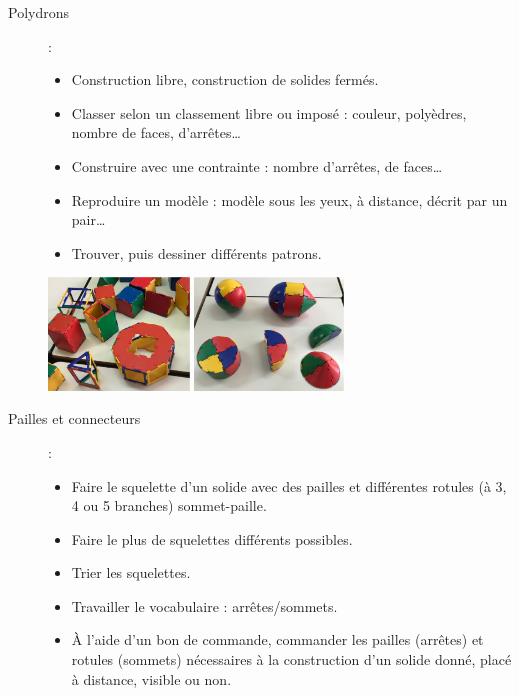 \begin{exercice*}
\begin{description}
   \item[Polydrons]:
      \begin{itemize}
         \item Construction libre, construction de solides fermés.
         \item Classer selon un classement libre ou imposé : couleur, polyèdres, nombre de faces, d'arrêtes\dots
         \item Construire avec une contrainte : nombre d'arrêtes, de faces\dots
         \item Reproduire un modèle : modèle sous les yeux, à distance, décrit par un pair\dots
         \item Trouver, puis dessiner différents patrons.
      \end{itemize}
      \begin{center}
         \includegraphics[height=3cm]{Geometrie_did/Images/Geo6_activites_polydron2} \qquad \includegraphics[height=3cm]{Geometrie_did/Images/Geo6_activites_polydron1}
      \end{center}
   \item[Pailles et connecteurs]:
      \begin{itemize}
         \item Faire le squelette d’un solide avec des pailles et différentes rotules (à 3, 4 ou 5 branches) sommet-paille.
         \item Faire le plus de squelettes différents possibles.
         \item Trier les squelettes.
         \item Travailler le vocabulaire : arrêtes/sommets.
         \item À l’aide d’un bon de commande, commander les pailles (arrêtes) et rotules (sommets) nécessaires à la construction d’un solide donné, placé à distance, visible ou non.

\end{itemize}
\end{description}
\end{exercice*}
